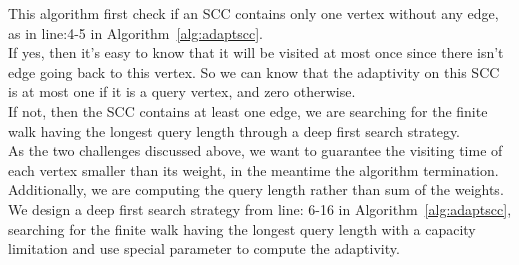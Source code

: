 This algorithm first check if an SCC contains only one vertex without any edge, as in line:4-5 in Algorithm~\ref{alg:adaptscc}.
\\
If yes, then it's easy to know that it will be visited 
at most once since there isn't edge going back to this vertex. 
So we can know that the adaptivity on this SCC is at most one if it is a query vertex,
and zero otherwise.
\\
If not, then the SCC contains at least one edge, we are searching for the finite walk having the longest query length through a deep first search strategy.
\\
As the two challenges discussed above, we want to guarantee the visiting time of each vertex smaller than 
its weight, in the meantime the algorithm termination. 
Additionally, we are computing the query length rather than sum of the weights.
We design a deep first search strategy
from line: 6-16 in Algorithm~\ref{alg:adaptscc}, 
searching for the finite walk having the longest query length
with a capacity limitation and use special parameter to compute the adaptivity.
\\
